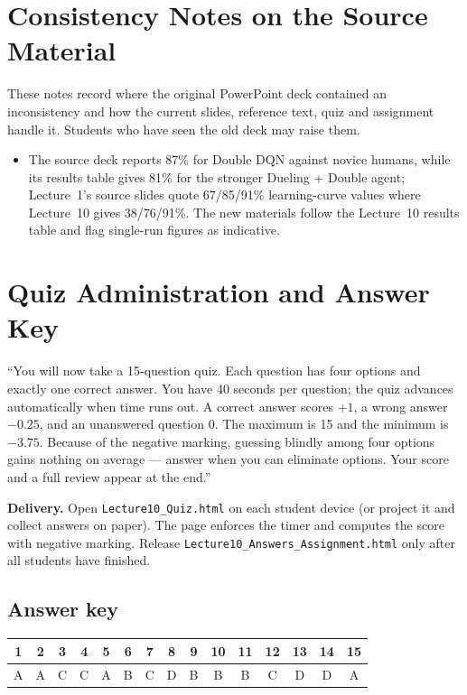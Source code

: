 \documentclass[11pt]{article}
\begin{document}
\section{Consistency Notes on the Source Material}These notes record where the original PowerPoint deck contained an inconsistency and how the current slides, reference text, quiz and assignment handle it. Students who have seen the old deck may raise them.\begin{itemize}\item The source deck reports 87\% for Double DQN against novice humans, while its results table gives 81\% for the stronger Dueling + Double agent; Lecture~1's source slides quote 67/85/91\% learning-curve values where Lecture~10 gives 38/76/91\%. The new materials follow the Lecture~10 results table and flag single-run figures as indicative.\end{itemize}

\section{Quiz Administration and Answer Key}

\begin{sayit}``You will now take a 15-question quiz. Each question has four options and exactly one correct answer. You have 40 seconds per question; the quiz advances automatically when time runs out. A correct answer scores $+1$, a wrong answer $-0.25$, and an unanswered question 0. The maximum is 15 and the minimum is $-3.75$. Because of the negative marking, guessing blindly among four options gains nothing on average --- answer when you can eliminate options. Your score and a full review appear at the end.''\end{sayit}

\textbf{Delivery.} Open \texttt{Lecture10\_Quiz.html} on each student device (or project it and collect answers on paper). The page enforces the timer and computes the score with negative marking. Release \texttt{Lecture10\_Answers\_Assignment.html} only after all students have finished.

\subsection*{Answer key}\begin{center}\small\renewcommand{\arraystretch}{1.3}\begin{tabular}{|c|c|c|c|c|c|c|c|c|c|c|c|c|c|c|}\hline \textbf{1} & \textbf{2} & \textbf{3} & \textbf{4} & \textbf{5} & \textbf{6} & \textbf{7} & \textbf{8} & \textbf{9} & \textbf{10} & \textbf{11} & \textbf{12} & \textbf{13} & \textbf{14} & \textbf{15}\\\hline A & A & C & C & A & B & C & D & B & B & B & C & D & D & A\\\hline\end{tabular}\end{center}
\end{document}

